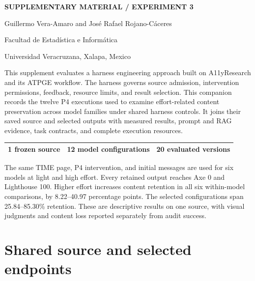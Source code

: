 \documentclass[acmsmall,screen,nonacm]{acmart}
\begin{document}
\raggedbottom
\pagestyle{plain}
\begin{titlepage}
\vspace*{12pt}
\noindent\textcolor{HarnessBlue}{\textbf{SUPPLEMENTARY MATERIAL / EXPERIMENT 3}}\par\bigskip
{}
\medskip
{}
\vspace{22pt}
\noindent Guillermo Vera-Amaro and José Rafael Rojano-Cáceres\par
\medskip
\noindent Facultad de Estadística e Informática\par
\noindent Universidad Veracruzana, Xalapa, Mexico\par
\vspace{24pt}
\noindent{\Large\bfseries\textcolor{HarnessBlue}{Experiment 3. Model family and reasoning effort}\par}
\medskip
This supplement evaluates a harness engineering approach built on A11yResearch and its ATPGE workflow. The harness governs source admission, intervention permissions, feedback, resource limits, and result selection. This companion records the twelve P4 executions used to examine effort-related content preservation across model families under shared harness controls. It joins their saved source and selected outputs with measured results, prompt and RAG evidence, task contracts, and complete execution resources.\par
\bigskip
\noindent\begin{tabular*}{\linewidth}{@{\extracolsep{\fill}}lll@{}}\toprule
\textbf{1} frozen source & \textbf{12} model configurations & \textbf{20} evaluated versions\\\bottomrule
\end{tabular*}\par\bigskip
The same TIME page, P4 intervention, and initial messages are used for six models at light and high effort. Every retained output reaches Axe 0 and Lighthouse 100. Higher effort increases content retention in all six within-model comparisons, by 8.22--40.97 percentage points. The selected configurations span 25.84--85.30\% retention. These are descriptive results on one source, with visual judgments and content loss reported separately from audit success.
\end{titlepage}

\section{Shared source and selected endpoints}
\end{document}
